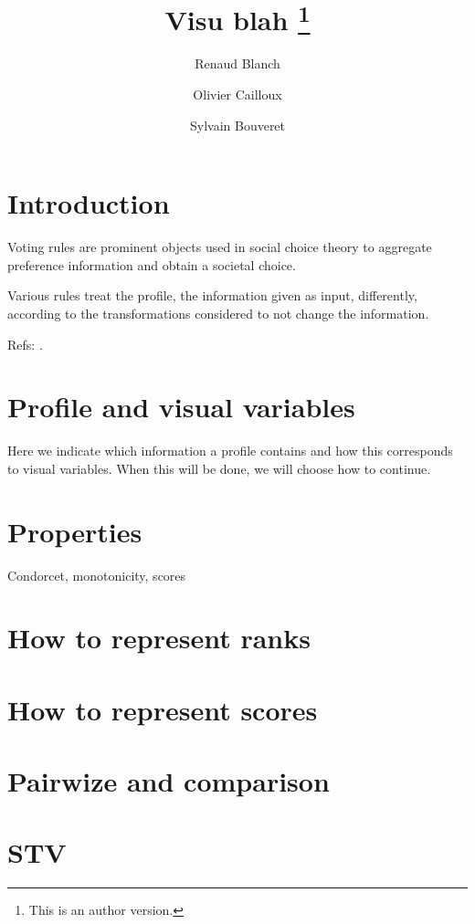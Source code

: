 \documentclass[version=last, pagesize, twoside=off, bibliography=totoc, DIV=calc, fontsize=12pt, a4paper, french, english]{scrartcl}
\begin{document}
\title{%
	\texorpdfstring{
		Visu blah%
		\thanks{
			This is an author version.
		}
	}{%
		Visu
	}
}
\author{Renaud Blanch}
\author{Olivier Cailloux}
\author{Sylvain Bouveret}
\maketitle

\section{Introduction}
\label{sec:intro}
Voting rules are prominent objects used in social choice theory to aggregate preference information and obtain a societal choice.

Various rules treat the profile, the information given as input, differently, according to the transformations considered to not change the information.

Refs: \citet{sen_social_1986, sen_informational_1974, sen_weights_1977, blackorby_social_1984}.

\section{Profile and visual variables}
Here we indicate which information a profile contains and how this corresponds to visual variables.
When this will be done, we will choose how to continue.

\section{Properties}
Condorcet, monotonicity, scores
\section{How to represent ranks}
\section{How to represent scores}
\section{Pairwize and comparison}
\section{STV}


\end{document}

